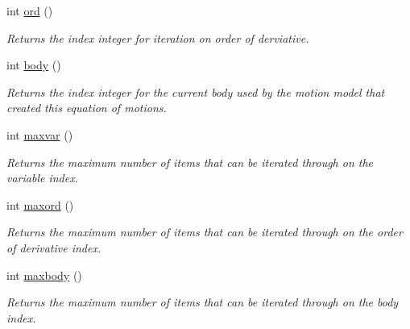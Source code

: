 \begin{DoxyCompactItemize}
int \hyperlink{class_equationof_motion_a31f904818ce75c9e2a2b5cff9fc707a5}{ord} ()
\begin{DoxyCompactList}\small\item\em Returns the index integer for iteration on order of derviative. \end{DoxyCompactList}\item 
int \hyperlink{class_equationof_motion_ac87fe1d5112f5b42f9afd5f1c3b9002c}{body} ()
\begin{DoxyCompactList}\small\item\em Returns the index integer for the current body used by the motion model that created this equation of motions. \end{DoxyCompactList}\item 
int \hyperlink{class_equationof_motion_a8c6367e13c8f027f4a0936b821ff9363}{maxvar} ()
\begin{DoxyCompactList}\small\item\em Returns the maximum number of items that can be iterated through on the variable index. \end{DoxyCompactList}\item 
int \hyperlink{class_equationof_motion_ad8271e1cc1d78b7bf80a90fe3c3b06b4}{maxord} ()
\begin{DoxyCompactList}\small\item\em Returns the maximum number of items that can be iterated through on the order of derivative index. \end{DoxyCompactList}\item 
int \hyperlink{class_equationof_motion_a0fea5098961fce0004b978223b4a501b}{maxbody} ()
\begin{DoxyCompactList}\small\item\em Returns the maximum number of items that can be iterated through on the body index. \end{DoxyCompactList}\end{DoxyCompactItemize}
